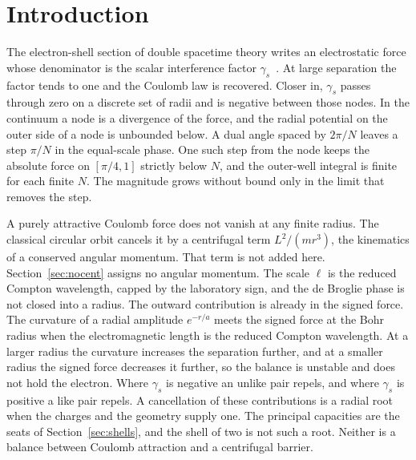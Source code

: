 \documentclass[a4paper]{article}
\begin{document}
\section{Introduction}

The electron-shell section of double spacetime theory writes an electrostatic force whose denominator is the scalar interference factor \(\gamma_s\)~\cite{dst-main}. At large separation the factor tends to one and the Coulomb law is recovered. Closer in, \(\gamma_s\) passes through zero on a discrete set of radii and is negative between those nodes. In the continuum a node is a divergence of the force, and the radial potential on the outer side of a node is unbounded below. A dual angle spaced by \(2\pi/N\) leaves a step \(\pi/N\) in the equal-scale phase. One such step from the node keeps the absolute force on \([\pi/4,1]\) strictly below \(N\), and the outer-well integral is finite for each finite \(N\). The magnitude grows without bound only in the limit that removes the step.

A purely attractive Coulomb force does not vanish at any finite radius. The classical circular orbit cancels it by a centrifugal term \(L^{2}/(m r^{3})\), the kinematics of a conserved angular momentum. That term is not added here. Section~\ref{sec:nocent} assigns no angular momentum. The scale \(\ell\) is the reduced Compton wavelength, capped by the laboratory sign, and the de Broglie phase is not closed into a radius. The outward contribution is already in the signed force. The curvature of a radial amplitude \(e^{-r/a}\) meets the signed force at the Bohr radius when the electromagnetic length is the reduced Compton wavelength. At a larger radius the curvature increases the separation further, and at a smaller radius the signed force decreases it further, so the balance is unstable and does not hold the electron. Where \(\gamma_s\) is negative an unlike pair repels, and where \(\gamma_s\) is positive a like pair repels. A cancellation of these contributions is a radial root when the charges and the geometry supply one. The principal capacities are the seats of Section~\ref{sec:shells}, and the shell of two is not such a root. Neither is a balance between Coulomb attraction and a centrifugal barrier.
\end{document}
